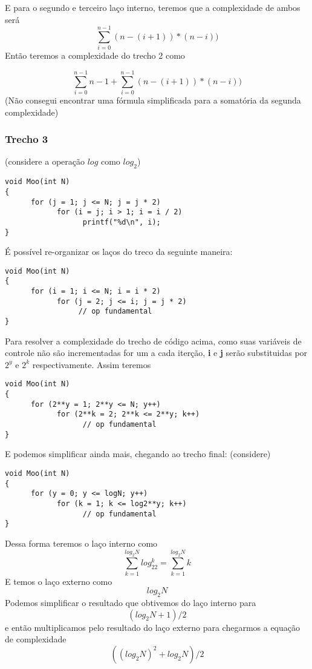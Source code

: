 \documentclass[
]{article}
\begin{document}
E para o segundo e terceiro laço interno, teremos que a complexidade de
ambos será \[\sum_{i=0}^{n-1} (n-(i+1))*(n-i))\] Então teremos a
complexidade do trecho 2 como

\[\sum_{i=0}^{n-1} n-1 + \sum_{i=0}^{n-1} (n-(i+1))*(n-i))\] (Não
consegui encontrar uma fórmula simplificada para a somatória da segunda
complexidade)

\hypertarget{trecho-3}{%
\subsubsection{Trecho 3}\label{trecho-3}}

(considere a operação \(log\) como \(log_2\))

\begin{verbatim}
void Moo(int N)
{
      for (j = 1; j <= N; j = j * 2)
            for (i = j; i > 1; i = i / 2)
                  printf("%d\n", i);
}
\end{verbatim}

É possível re-organizar os laços do treco da seguinte maneira:

\begin{verbatim}
void Moo(int N)
{
      for (i = 1; i <= N; i = i * 2)
            for (j = 2; j <= i; j = j * 2)
                 // op fundamental
}
\end{verbatim}

Para resolver a complexidade do trecho de código acima, como suas
variáveis de controle não são incrementadas for um a cada iterção,
\textbf{i} e \textbf{j} serão substituidas por \(2^y\) e \(2^k\)
respectivamente. Assim teremos

\begin{verbatim}
void Moo(int N)
{
      for (2**y = 1; 2**y <= N; y++)
            for (2**k = 2; 2**k <= 2**y; k++)
                  // op fundamental
}
\end{verbatim}

E podemos simplificar ainda mais, chegando ao trecho final: (considere)

\begin{verbatim}
void Moo(int N)
{
      for (y = 0; y <= logN; y++)
            for (k = 1; k <= log2**y; k++)
                  // op fundamental
}
\end{verbatim}

Dessa forma teremos o laço interno como
\[\sum_{k=1}^{log_2N}log_22^k = \sum_{k=1}^{log_2N}k\] E temos o laço
externo como \[log_2N\] Podemos simplificar o resultado que obtivemos do
laço interno para \[(log_2N + 1)/2\] e então multiplicamos pelo
resultado do laço externo para chegarmos a equação de complexidade
\[((log_2N)^2 + log_2N)/2\]
\end{document}
